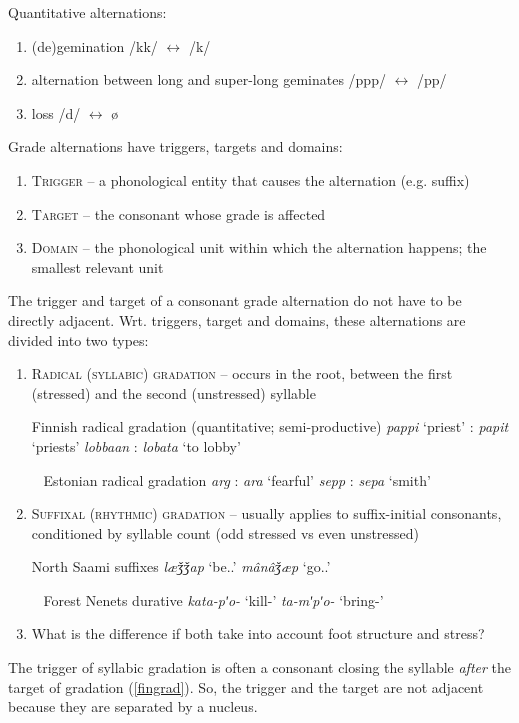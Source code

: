 \documentclass[a4paper, 12pt]{article}
\begin{document}
	\noindent Quantitative alternations:
	
	\begin{enumerate}[$\gg$]
	\setlength\itemsep{0em}
		\item (de)gemination \hfill /kk/ $\leftrightarrow$ /k/
		\item alternation between long and super-long geminates \hfill /ppp/ $\leftrightarrow$ /pp/
		\item loss \hfill /d/ $\leftrightarrow$ ø
	\end{enumerate}
	Grade alternations have triggers, targets and domains:
	
	\begin{enumerate}[$\gg$]
	\setlength\itemsep{0em}
		\item \textsc{Trigger} -- a phonological entity that causes the alternation (e.g. suffix)
		\item \textsc{Target} -- the consonant whose grade is affected
		\item \textsc{Domain} -- the phonological unit within which the alternation happens; the smallest relevant unit
	\end{enumerate}
	The trigger and target of a consonant grade alternation do not have to be directly adjacent. Wrt. triggers, target and domains, these alternations are divided into two types:
	
	\begin{enumerate}[$\gg$]
		\item \textsc{Radical (syllabic) gradation} -- occurs in the root, between the first (stressed) and the second (unstressed) syllable
		
		\pex Finnish radical gradation (quantitative; semi-productive)
			\a \emph{pappi} `priest' : \emph{papit} `priests'
			\a \emph{lobbaan} : \emph{lobata} `to lobby'
		\xe
		
		\pex~ Estonian radical gradation
			\a \emph{arg} : \emph{ara} `fearful'
			\a \emph{sepp} : \emph{sepa} `smith' 
		\xe
		
		\item \textsc{Suffixal (rhythmic) gradation} -- usually applies to suffix-initial consonants, conditioned by syllable count (odd stressed vs even unstressed)
		
		\pex North Saami suffixes \parencite[p. 149]{korhonen1981}
			\a \emph{læǯǯap} `be.{\Pot}.{\Fpl}'
			\a \emph{m\^{a}n\^{a}ǯæp} `go.{\Pot}.{\Fpl}'
		\xe
		
		\pex~ Forest Nenets durative \parencite[p. 359]{salminen2007}
			\a \emph{kata-pʹo-} `kill-{\Dur}'
			\a \emph{ta-mʹpʹo-} `bring-{\Dur}'
		\xe
		\item What is the difference if both take into account foot structure and stress?
	\end{enumerate}
	The trigger of syllabic gradation is often a consonant closing the syllable \emph{after} the target of gradation (\ref{fingrad}). So, the trigger and the target are not adjacent because they are separated by a nucleus.  
		
\end{document}
